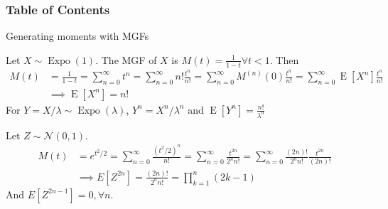 \documentclass[8pt]{beamer}
\newcommand{\myexpo}[1]{\operatorname{Expo}\!\left(#1\right)}
\newcommand{\expec}[1]{\operatorname{E}\left[ #1 \right]}
\begin{document}
\begin{frame}
    \frametitle{Table of Contents}
    \tableofcontents[currentsubsection]
\end{frame}

\begin{frame}{Generating moments with MGFs}
    \begin{example}
        Let $X \sim \myexpo{1}$. The MGF of $X$ is $M(t) = \frac{1}{1 - t} \forall t<1$. Then
        \[
        \begin{aligned}
            M(t) &= \frac{1}{1 - t} = \sum_{n=0}^\infty t^n = \sum_{n=0}^\infty n! \frac{t^n}{n!} = \sum_{n=0}^\infty M^{(n)}(0) \frac{t^n}{n!} = \sum_{n=0}^\infty \expec{X^n} \frac{t^n}{n!} \\
            &\implies \expec{X^n} = n!
        \end{aligned}
        \]
        For $Y = X / \lambda \sim \myexpo{\lambda}$, $Y^n = X^n / \lambda^n$ and $\expec{Y^n} = \frac{n!}{\lambda^n}$
    \end{example}

    \begin{example}
        Let $Z \sim \mathcal{N}(0, 1)$.
        \[
        \begin{aligned}
            M(t) &= e^{t^2 /2} = \sum_{n=0}^\infty \frac{(t^2/2)^n}{n!} = \sum_{n=0}^\infty \frac{t^{2n}}{2^n n!} = \sum_{n=0}^\infty \frac{(2n)!}{2^n n!} \frac{t^{2n}}{(2n)!} \\
            &\implies E[Z^{2n}] = \frac{(2n)!}{2^n n!} = \prod_{k=1}^n (2k - 1)
        \end{aligned}
        \]
        And $E[Z^{2n-1}] = 0, \forall n$. 
    \end{example}
\end{frame}
\end{document}
